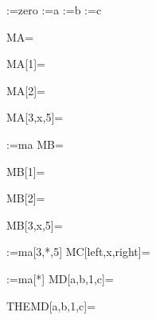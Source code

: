 \documentclass{article}
\begin{document}

\ma:={zero}
\ma[1]:={a}
\ma[2]:={b}
\ma[3,x,5]:={c}

MA=\ma\par
MA[1]=\ma[1]\par
MA[2]=\ma[2]\par
MA[3,x,5]=\ma[3,x,5]\par

\mb*:={ma}
MB=\mb\par
MB[1]=\mb[1]\par
MB[2]=\mb[2]\par
MB[3,x,5]=\mb[3,x,5]\par
:={ma[3,*,5]}
MC[left,x,right]=\par
\md*[a,b,*,c]:={ma[*]}
MD[a,b,1,c]=\md[a,b,1,c]\par
THEMD[a,b,1,c]=\themd[a,b,1,c]\par
\end{document}
